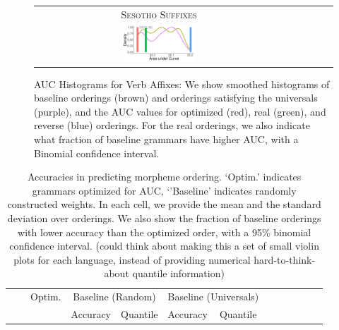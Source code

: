 \documentclass[11pt,letterpaper]{article}
\newcommand\mhahn[1]{{\color{red}(#1)}}
\begin{document}
\begin{figure}
\begin{tabular}{cccccc}
            \\
            \textsc{Sesotho Suffixes} \\
            \includegraphics[width=0.3\textwidth]{figures/sesotho_suffixes/suffixes-byMorphemes-auc-hist-heldout-Coarse-FineSurprisal-optimized.pdf}
    \end{tabular}

    
    \caption{AUC Histograms for Verb Affixes: We show smoothed histograms of baseline orderings (brown) and orderings satisfying the universals (purple), and the AUC values for optimized (red), real (green), and reverse (blue) orderings. For the real orderings, we also indicate what fraction of baseline grammars have higher AUC, with a Binomial confidence interval. }
    \label{fig:auc_verbs}
\end{figure}


\begin{table}[]
    \centering
    \begin{tabular}{l|l|l|ll|ll|llllll}
     &   &     Optim. & \multicolumn{2}{|c}{Baseline (Random)} & \multicolumn{2}{|c|}{Baseline (Universals)}  \\ 
     &  &            & Accuracy & Quantile & Accuracy & Quantile \\
     \hline
     
    \end{tabular}
    \caption{Accuracies in predicting morpheme ordering. `Optim.' indicates grammars optimized for AUC, `'Baseline' indicates randomly constructed weights.
    In each cell, we provide the mean and the standard deviation over orderings.
    We also show the fraction of baseline orderings with lower accuracy than the optimized order, with a 95\% binomial confidence interval.
    \mhahn{could think about making this a set of small violin plots for each language, instead of providing numerical hard-to-think-about quantile information}
    }
    \label{tab:optimized_acc}
\end{table}
\end{document}

